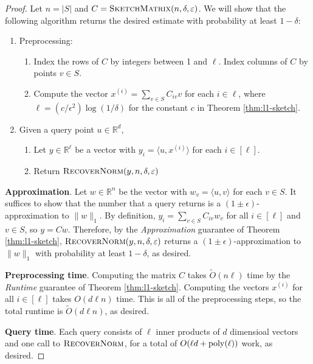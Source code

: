 \begin{proof}
Let $n = |S|$ and $C = \textsc{SketchMatrix}(n,\delta,\epsilon)$. We will show that the following algorithm returns the desired estimate with probability at least $1 - \delta$:

\begin{enumerate}
    \item Preprocessing:
    \begin{enumerate}
        \item Index the rows of $C$ by integers between 1 and $\ell$. Index columns of $C$ by points $v\in S$.
        \item Compute the vector $x^{(i)} = \sum_{v\in S} C_{iv} v$ for each $i\in \ell$, where $\ell = (c/\epsilon^2)\log(1/\delta)$ for the constant $c$ in Theorem \ref{thm:l1-sketch}.
    \end{enumerate}
    \item Given a query point $u\in \mathbb{R}^d$,
    \begin{enumerate}
        \item Let $y\in \mathbb{R}^{\ell}$ be a vector with $y_i = \langle u, x^{(i)}\rangle$ for each $i\in [\ell]$.
        \item Return $\textsc{RecoverNorm}(y,n,\delta,\epsilon)$
    \end{enumerate}
\end{enumerate}

\textbf{Approximation}. Let $w \in \mathbb{R}^n$ be the vector with $w_v = \langle u,v\rangle$ for each $v\in S$. It suffices to show that the number that a query returns is a $(1\pm\epsilon)$-approximation to $\|w\|_1$. By definition, $y_i = \sum_{v\in S} C_{iv} w_v$ for all $i\in [\ell]$ and $v\in S$, so $y = C w$. Therefore, by the \emph{Approximation} guarantee of Theorem \ref{thm:l1-sketch}, $\textsc{RecoverNorm}(y,n,\delta,\epsilon)$ returns a $(1\pm\epsilon)$-approximation to $\|w\|_1$ with probability at least $1 - \delta$, as desired.

\textbf{Preprocessing time}. Computing the matrix $C$ takes $\tilde{O}(n\ell)$ time by the \emph{Runtime} guarantee of Theorem \ref{thm:l1-sketch}. Computing the vectors $x^{(i)}$ for all $i\in [\ell]$ takes $O(d\ell n)$ time. This is all of the preprocessing steps, so the total runtime is $\tilde{O}(d\ell n)$, as desired.

\textbf{Query time}. Each query consists of $\ell$ inner products of $d$ dimensioal vectors and one call to $\textsc{RecoverNorm}$, for a total of $O(\ell d + \poly(\ell))$ work, as desired.
\end{proof}

